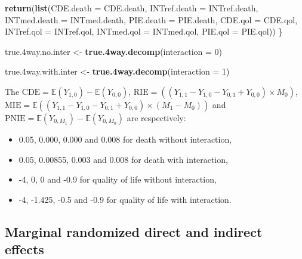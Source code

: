 \documentclass[
]{book}
\newenvironment{Shaded}{\begin{snugshade}}{\end{snugshade}}
\newcommand{\AttributeTok}[1]{\textcolor[rgb]{0.13,0.29,0.53}{#1}}
\newcommand{\DecValTok}[1]{\textcolor[rgb]{0.00,0.00,0.81}{#1}}
\newcommand{\FloatTok}[1]{\textcolor[rgb]{0.00,0.00,0.81}{#1}}
\newcommand{\FunctionTok}[1]{\textcolor[rgb]{0.13,0.29,0.53}{\textbf{#1}}}
\newcommand{\NormalTok}[1]{#1}
\newcommand{\OtherTok}[1]{\textcolor[rgb]{0.56,0.35,0.01}{#1}}
\providecommand{\tightlist}{%
  \setlength{\itemsep}{0pt}\setlength{\parskip}{0pt}}
\begin{document}
\begin{Shaded}
\begin{Highlighting}[]
  \FunctionTok{return}\NormalTok{(}\FunctionTok{list}\NormalTok{(}\AttributeTok{CDE.death =}\NormalTok{ CDE.death, }\AttributeTok{INTref.death =}\NormalTok{ INTref.death, }
              \AttributeTok{INTmed.death =}\NormalTok{ INTmed.death, }\AttributeTok{PIE.death =}\NormalTok{ PIE.death,}
              \AttributeTok{CDE.qol =}\NormalTok{ CDE.qol, }\AttributeTok{INTref.qol =}\NormalTok{ INTref.qol, }
              \AttributeTok{INTmed.qol =}\NormalTok{ INTmed.qol, }\AttributeTok{PIE.qol =}\NormalTok{ PIE.qol))}
\NormalTok{\}}
\end{Highlighting}
\end{Shaded}

\begin{Shaded}
\begin{Highlighting}[]
\NormalTok{true}\FloatTok{.4}\NormalTok{way.no.inter }\OtherTok{\textless{}{-}} \FunctionTok{true.4way.decomp}\NormalTok{(}\AttributeTok{interaction =} \DecValTok{0}\NormalTok{)}

\NormalTok{true}\FloatTok{.4}\NormalTok{way.with.inter }\OtherTok{\textless{}{-}} \FunctionTok{true.4way.decomp}\NormalTok{(}\AttributeTok{interaction =} \DecValTok{1}\NormalTok{)}
\end{Highlighting}
\end{Shaded}

The \(\text{CDE}=\mathbb{E}\left(Y_{1,0} \right) - \mathbb{E}\left(Y_{0,0}\right)\), \(\text{RIE}=\left((Y_{1,1} - Y_{1,0} - Y_{0,1} + Y_{0,0}) \times M_0\right)\), \(\text{MIE}= \mathbb{E}\left((Y_{1,1} - Y_{1,0} - Y_{0,1} + Y_{0,0}) \times (M_1 - M_0)\right)\) and \(\text{PNIE}=\mathbb{E}\left(Y_{0,M_1}\right) - \mathbb{E}\left(Y_{0,M_0}\right)\) are respectively:

\begin{itemize}
\tightlist
\item
  0.05, 0.000, 0.000 and 0.008 for death without interaction,
\item
  0.05, 0.00855, 0.003 and 0.008 for death with interaction,
\item
  -4, 0, 0 and -0.9 for quality of life without interaction,
\item
  -4, -1.425, -0.5 and -0.9 for quality of life with interaction.
\end{itemize}

\subsection{Marginal randomized direct and indirect effects}\label{marginal-randomized-direct-and-indirect-effects}
\end{document}
